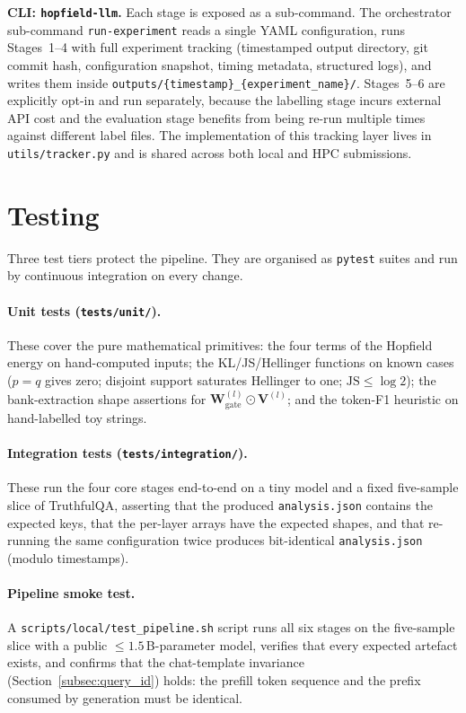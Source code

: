 \textbf{CLI: \texttt{hopfield-llm}.} Each stage is exposed as a
sub-command. The orchestrator sub-command \texttt{run-experiment} reads a
single YAML configuration, runs Stages~1–4 with full experiment
tracking (timestamped output directory, git commit hash, configuration
snapshot, timing metadata, structured logs), and writes them inside
\texttt{outputs/\{timestamp\}\_\{experiment\_name\}/}. Stages~5–6 are
explicitly opt-in and run separately, because the labelling stage incurs
external API cost and the evaluation stage benefits from being re-run
multiple times against different label files. The implementation of this
tracking layer lives in \texttt{utils/tracker.py} and is shared across
both local and HPC submissions.

\section{Testing}
\label{sec:testing}

Three test tiers protect the pipeline. They are organised as
\texttt{pytest} suites and run by continuous integration on every change.

\paragraph{Unit tests (\texttt{tests/unit/}).} These cover the pure
mathematical primitives: the four terms of the Hopfield energy on
hand-computed inputs; the KL/JS/Hellinger functions on known cases
($p = q$ gives zero; disjoint support saturates Hellinger to one;
$\mathrm{JS} \le \log 2$); the bank-extraction shape assertions for
$\mathbf{W}_{\mathrm{gate}}^{(l)} \odot \mathbf{V}^{(l)}$; and the token-F1
heuristic on hand-labelled toy strings.

\paragraph{Integration tests (\texttt{tests/integration/}).} These run
the four core stages end-to-end on a tiny model and a fixed five-sample
slice of TruthfulQA, asserting that the produced \texttt{analysis.json}
contains the expected keys, that the per-layer arrays have the expected
shapes, and that re-running the same configuration twice produces
bit-identical \texttt{analysis.json} (modulo timestamps).

\paragraph{Pipeline smoke test.} A \texttt{scripts/local/test\_pipeline.sh}
script runs all six stages on the five-sample slice with a public
$\le 1.5$\,B-parameter model, verifies that every expected artefact
exists, and confirms that the chat-template invariance
(Section~\ref{subsec:query_id}) holds: the prefill token sequence and the
prefix consumed by generation must be identical.

